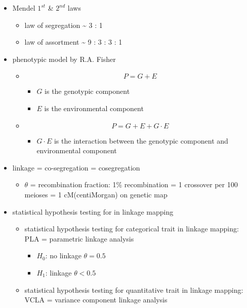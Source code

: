 \documentclass[
]{book}
\providecommand{\tightlist}{%
  \setlength{\itemsep}{0pt}\setlength{\parskip}{0pt}}
\theoremstyle{definition}
\theoremstyle{definition}
\theoremstyle{definition}
\theoremstyle{definition}
\theoremstyle{remark}
\begin{document}
\begin{itemize}
\tightlist
\item
  Mendel \(1^{st}\) \& \(2^{nd}\) laws

  \begin{itemize}
  \tightlist
  \item
    law of segregation \textasciitilde{} 3 : 1
  \item
    law of assortment \textasciitilde{} 9 : 3 : 3 : 1
  \end{itemize}
\item
  phenotypic model by R.A. Fisher

  \begin{itemize}
  \tightlist
  \item
    \[P = G + E\]

    \begin{itemize}
    \tightlist
    \item
      \(G\) is the genotypic component
    \item
      \(E\) is the environmental component
    \end{itemize}
  \item
    \[P = G + E + G \cdot E\]

    \begin{itemize}
    \tightlist
    \item
      \(G \cdot E\) is the interaction between the genotypic component and environmental component
    \end{itemize}
  \end{itemize}
\item
  linkage = co-segregation = cosegregation

  \begin{itemize}
  \tightlist
  \item
    \(\theta\) = recombination fraction: 1\% recombination = 1 crossover per 100 meioses = 1 cM(centiMorgan) on genetic map
  \end{itemize}
\item
  statistical hypothesis testing for in linkage mapping

  \begin{itemize}
  \tightlist
  \item
    statistical hypothesis testing for categorical trait in linkage mapping: PLA = parametric linkage analysis

    \begin{itemize}
    \tightlist
    \item
      \(H_0\): no linkage \(\theta = 0.5\)
    \item
      \(H_1\): linkage \(\theta < 0.5\)
    \end{itemize}
  \item
    statistical hypothesis testing for quantitative trait in linkage mapping: VCLA = variance component linkage analysis


\end{itemize}
\end{itemize}
\end{document}
